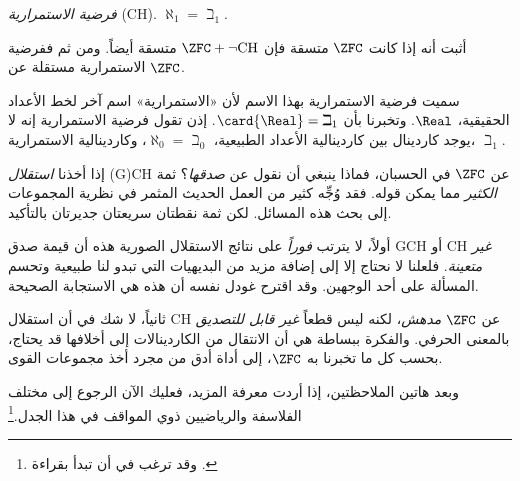 \documentclass[../../../include/open-logic-section]{subfiles}
\begin{document}
\begin{defish}
\emph{فرضية الاستمرارية} (CH). $\aleph_1 = \beth_1$.
\end{defish}

أثبت \citet{Cohen1963} أنه إذا كانت $\ZFC$ متسقة فإن
$\ZFC + \lnot\text{CH}$ متسقة أيضاً. ومن ثم ففرضية الاستمرارية مستقلة
عن $\ZFC$.

سميت فرضية الاستمرارية بهذا الاسم لأن «الاستمرارية» اسم آخر لخط الأعداد
الحقيقية، $\Real$. وتخبرنا  بأن
$\card{\Real} = \beth_1$. إذن تقول فرضية الاستمرارية إنه لا يوجد
كاردينال بين كاردينالية الأعداد الطبيعية،
$\aleph_0 = \beth_0$، وكاردينالية الاستمرارية، $\beth_1$.

إذا أخذنا \emph{استقلال} (G)CH عن $\ZFC$ في الحسبان، فماذا ينبغي أن
نقول عن \emph{صدقها}؟ ثمة \emph{الكثير} مما يمكن قوله. فقد وُجِّه كثير
من العمل الحديث المثمر في نظرية المجموعات إلى بحث هذه المسائل. لكن ثمة
نقطتان سريعتان جديرتان بالتأكيد.

أولاً، لا يترتب \emph{فوراً} على نتائج الاستقلال الصورية هذه أن قيمة صدق
GCH أو CH \emph{غير متعينة}. فلعلنا لا نحتاج إلا إلى إضافة مزيد من
البديهيات التي تبدو لنا طبيعية وتحسم المسألة على أحد الوجهين. وقد اقترح
غودل نفسه أن هذه هي الاستجابة الصحيحة.

ثانياً، لا شك في أن استقلال CH عن $\ZFC$ \emph{مدهش}، لكنه ليس قطعاً
\emph{غير قابل للتصديق} بالمعنى الحرفي. والفكرة ببساطة هي أن الانتقال من
الكاردينالات إلى أخلافها قد يحتاج، بحسب كل ما تخبرنا به $\ZFC$، إلى
أداة أدق من مجرد أخذ مجموعات القوى.

وبعد هاتين الملاحظتين، إذا أردت معرفة المزيد، فعليك الآن الرجوع إلى
مختلف الفلاسفة والرياضيين ذوي المواقف في هذا الجدل.\footnote{وقد ترغب في
أن تبدأ بقراءة \citet[\S15.6]{Potter2004}.}
\end{document}
